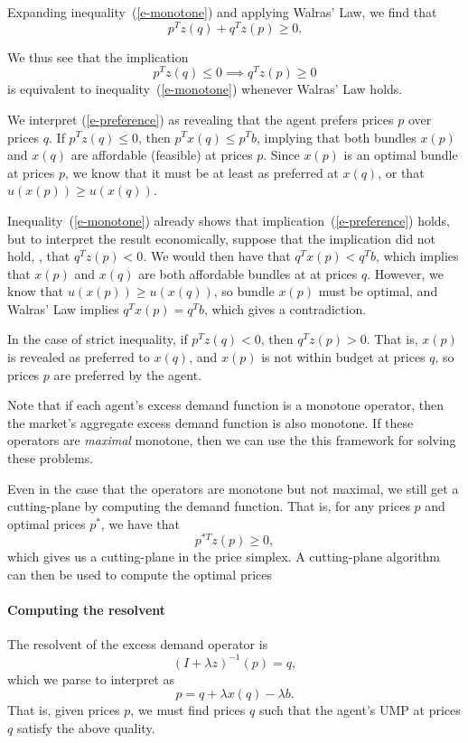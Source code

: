 \documentclass[12pt]{article}
\begin{document}
Expanding inequality~(\ref{e-monotone}) and applying Walras' Law, we find that
\[
p^T z(q) + q^T z(p) \geq 0.
\]

We thus see that the implication
\begin{equation}
\label{e-preference}
p^T z(q) \leq 0 \implies q^T z(p) \geq 0
\end{equation}
is equivalent  to inequality~(\ref{e-monotone}) whenever Walras' Law holds.

We interpret (\ref{e-preference}) as revealing that the agent prefers prices
$p$ over prices $q$. If $p^T z(q) \leq 0$, then $p^T x(q) \leq p^T b$, implying
that both bundles $x(p)$ and $x(q)$ are affordable (feasible) at prices $p$.
Since $x(p)$ is an optimal bundle at prices $p$, we know that it must be at least
as preferred at $x(q)$, or that $u(x(p)) \geq u(x(q))$.

Inequality~(\ref{e-monotone}) already shows that implication~(\ref{e-preference})
holds, but to interpret the result economically, suppose that the
implication did not hold, \ie, that $q^T z(p) < 0$. We would then have that
$q^T x(p) < q^T b$, which implies that $x(p)$ and $x(q)$ are both affordable
bundles at at prices $q$. However, we know that $u(x(p)) \geq u(x(q))$, so
bundle $x(p)$ must be optimal, and Walras' Law implies $q^T x(p) = q^T b$, which
gives a contradiction. 

In the case of strict inequality, if $p^T z(q) < 0$, then $q^T z(p) > 0$.
That is, $x(p)$ is revealed as preferred to $x(q)$, and $x(p)$ is not within
budget at prices $q$, so prices $p$ are preferred by the agent.

Note that if each agent's excess demand function is a monotone operator, then
the market's aggregate excess demand function is also monotone. If these
operators are \emph{maximal} monotone, then we can use the this framework for
solving these problems. 

Even in the case that the operators are monotone but not maximal, we still get
a cutting-plane by computing the demand function. That is, for any prices $p$
and optimal prices $p^*$, we have that
\[
p^{*T} z(p) \geq 0,
\]
which gives us a cutting-plane in the price simplex.
A cutting-plane algorithm can then be used to compute the optimal prices

\paragraph{Computing the resolvent}
The resolvent of the excess demand operator is
\[
(I + \lambda z)^{-1}(p) = q,
\]
which we parse to interpret as
\[
p = q + \lambda x(q) - \lambda b.
\]
That is, given prices $p$, we must find prices $q$ such that the agent's UMP
at prices $q$ satisfy the above quality.
\end{document}
